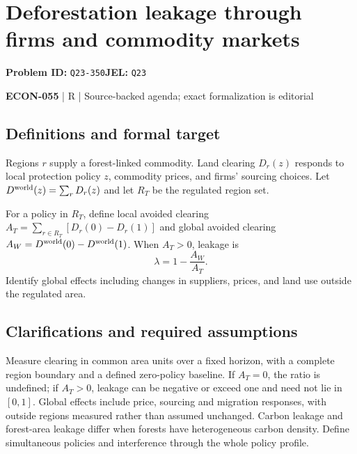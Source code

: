 \documentclass[11pt,a4paper]{article}
\begin{document}
\section*{Deforestation leakage through firms and commodity markets}
\textbf{Problem ID:} \texttt{Q23-350}\quad \textbf{JEL:} \texttt{Q23}\par
\label{problem:OP-0625}


\label{audited:ECON-055}

{\sffamily\small\color{muted}\textbf{ECON-055} | R | Source-backed agenda; exact formalization is editorial\par}

\subsection*{Definitions and formal target}

Regions $r$ supply a forest-linked commodity. Land clearing $D_r(z)$ responds to local protection policy $z$, commodity prices, and firms' sourcing choices. Let $D^{\rm world}(z)=\sum_rD_r(z)$ and let $R_T$ be the regulated region set.

For a policy in $R_T$, define local avoided clearing $A_T=\sum_{r\in R_T}[D_r(0)-D_r(1)]$ and global avoided clearing $A_W=D^{\rm world}(0)-D^{\rm world}(1)$. When $A_T>0$, leakage is
\[
 \lambda=1-\frac{A_W}{A_T}.
\]
Identify global effects including changes in suppliers, prices, and land use outside the regulated area.

\subsection*{Clarifications and required assumptions}

Measure clearing in common area units over a fixed horizon, with a complete region boundary and a defined zero-policy baseline. If \(A_T=0\), the ratio is undefined; if \(A_T>0\), leakage can be negative or exceed one and need not lie in \([0,1]\). Global effects include price, sourcing and migration responses, with outside regions measured rather than assumed unchanged. Carbon leakage and forest-area leakage differ when forests have heterogeneous carbon density. Define simultaneous policies and interference through the whole policy profile.
\end{document}
